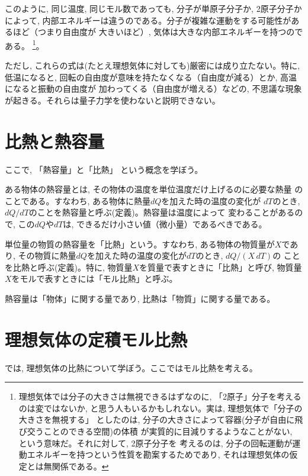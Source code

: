 このように, 同じ温度, 同じモル数であっても, 分子が単原子分子か, 2原子分子かによって, 
内部エネルギーは違うのである。分子が複雑な運動をする可能性があるほど（つまり自由度が
大きいほど）, 気体は大きな内部エネルギーを持つのである。
\footnote{理想気体では分子の大きさは無視できるはずなのに, 「2原子」分子を考える
のは変ではないか, と思う人もいるかもしれない。実は, 理想気体で「分子の大きさを無視する」
としたのは, 分子の大きさによって容器(分子が自由に飛び交うことのできる空間)の体積
が実質的に目減りするようなことがない, という意味だ。それに対して, 2原子分子を
考えるのは, 分子の回転運動が運動エネルギーを持つという性質を勘案するためであり, 
それは理想気体の仮定とは無関係である。}。

ただし, これらの式は(たとえ理想気体に対しても)厳密には成り立たない。特に, 低温になると, 
回転の自由度が意味を持たなくなる（自由度が減る）とか, 高温になると振動の自由度が
加わってくる（自由度が増える）などの, 不思議な現象が起きる。それらは量子力学を使わないと説明できない。\\



\section{比熱と熱容量}

ここで, 「熱容量」と「比熱」
という概念を学ぼう。

ある物体の熱容量とは, その物体の温度を単位温度だけ上げるのに必要な熱量
のことである。すなわち, ある物体に熱量$dQ$を加えた時の温度の変化が
$dT$のとき, $dQ/dT$のことを熱容量と呼ぶ(定義)。熱容量は温度によって
変わることがあるので, この$dQ$や$dT$は, できるだけ小さい値（微小量）であるべきである。

単位量の物質の熱容量を「比熱」という。すなわち, ある物体の物質量が$X$であり, 
その物質に熱量$dQ$を加えた時の温度の変化が$dT$のとき, $dQ/(X\,dT)$の
ことを比熱と呼ぶ(定義)。特に, 物質量$X$を質量で表すときに「比熱」と呼び, 
物質量$X$をモルで表すときには「モル比熱」と呼ぶ。

熱容量は「物体」に関する量であり, 比熱は「物質」に関する量である。\\


\section{理想気体の定積モル比熱}

では, 理想気体の比熱について学ぼう。ここではモル比熱を考える。

